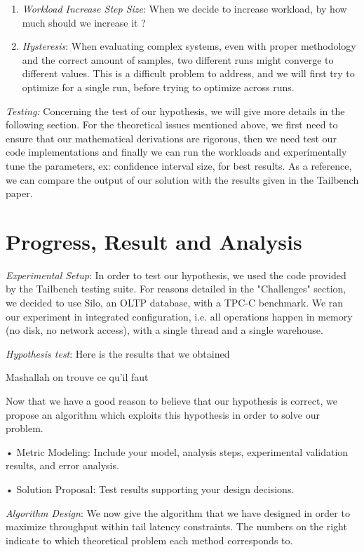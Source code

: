 \documentclass[12pt]{article}
\begin{document}
\begin{enumerate}
	\item \textit{Workload Increase Step Size}: When we decide to increase workload, by how much should we increase it ?

	\item \textit{Hysteresis}: When evaluating complex systems, even with proper methodology and the correct amount of samples, two different runs might converge to different values. This is a difficult problem to address, and we will first try to optimize for a single run, before trying to optimize across runs.
\end{enumerate}

\noindent \textit{Testing:} Concerning the test of our hypothesis, we will give more details in the following section. For the theoretical issues mentioned above, we first need to ensure that our mathematical derivations are rigorous, then we need test our code implementations and finally we can run the workloads and experimentally tune the parameters, ex: confidence interval size, for best results. As a reference, we can compare the output of our solution with the results given in the Tailbench paper.

\section{Progress, Result and Analysis}

\textit{Experimental Setup}: In order to test our hypothesis, we used the code provided by the Tailbench testing suite. For reasons detailed in the "Challenges" section, we decided to use Silo, an OLTP database, with a TPC-C benchmark. We ran our experiment in integrated configuration, i.e. all operations happen in memory (no disk, no network access), with a single thread and a single warehouse.

\singlespacing
\noindent \textit{Hypothesis test}:
\noindent Here is the results that we obtained

Mashallah on trouve ce qu'il faut

Now that we have a good reason to believe that our hypothesis is correct, we propose an algorithm which exploits this hypothesis in order to solve our problem.

• Metric Modeling: Include your model, analysis steps, experimental validation results, and error analysis.

• Solution Proposal: Test results supporting your design decisions.
\singlespacing

\noindent \textit{Algorithm Design}: We now give the algorithm that we have designed in order to maximize throughput within tail latency constraints. The numbers on the right indicate to which theoretical problem each method corresponds to.
\end{document}
